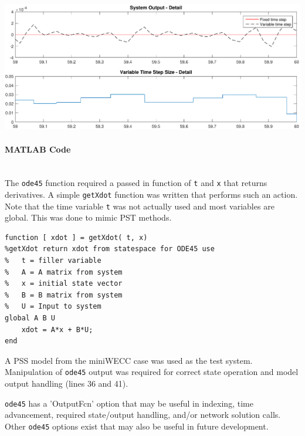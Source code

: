 \documentclass[12pt]{article}
\begin{document}
\includegraphics[width=\linewidth]{stepDetail2}


\paragraph{MATLAB Code} \ \\
The \verb|ode45| function required a passed in function of \verb|t| and \verb|x| that returns derivatives.
A simple \verb|getXdot| function was written that performs such an action.
Note that the time variable \verb|t| was not actually used and most variables are global.
This was done to mimic PST methods.
\begin{verbatim}
function [ xdot ] = getXdot( t, x)
%getXdot return xdot from statespace for ODE45 use
%   t = filler variable
%   A = A matrix from system
%   x = initial state vector
%   B = B matrix from system
%   U = Input to system
global A B U
    xdot = A*x + B*U;
end		
\end{verbatim}
A PSS model from the miniWECC case was used as the test system.
Manipulation of \verb|ode45| output was required for correct state operation and model output handling (lines 36 and 41).

\verb|ode45| has a 'OutputFcn' option that may be useful in indexing, time advancement, required state/output handling, and/or network solution calls.
Other \verb|ode45| options exist that may also be useful in future development.
\end{document}
